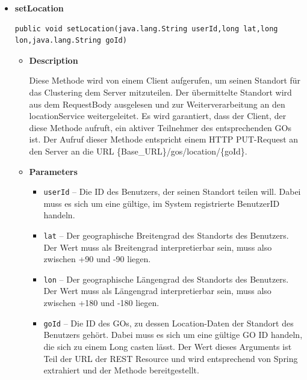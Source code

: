 \documentclass[11pt,a4paper]{report}
\begin{document}
{{{{{{{{{{{{{{{{{{{{\begin{itemize}
{\begin{itemize}
{}%
\end{itemize}
}%
\item{ 
\hypertarget{edu.kit.pse17.go_app.ClientCommunication.Upstream.GoRestController.setLocation(java.lang.String, long, long, java.lang.String)}{{\bf  setLocation}\\}
\begin{lstlisting}[frame=none]
public void setLocation(java.lang.String userId,long lat,long lon,java.lang.String goId)\end{lstlisting} %
\begin{itemize}
\item{
{\bf  Description}

Diese Methode wird von einem Client aufgerufen, um seinen Standort für das Clustering dem Server mitzuteilen. Der übermittelte Standort wird aus dem RequestBody ausgelesen und zur Weiterverarbeitung an den locationService weitergeleitet. Es wird garantiert, dass der Client, der diese Methode aufruft, ein aktiver Teilnehmer des entsprechenden GOs ist. Der Aufruf dieser Methode entspricht einem HTTP PUT-Request an den Server an die URL \{Base\_URL\}/gos/location/\{goId\}.
}
\item{
{\bf  Parameters}
  \begin{itemize}
   \item{
\texttt{userId} -- Die ID des Benutzers, der seinen Standort teilen will. Dabei muss es sich um eine gültige, im System registrierte BenutzerID handeln.}
   \item{
\texttt{lat} -- Der geographische Breitengrad des Standorts des Benutzers. Der Wert muss als Breitengrad interpretierbar sein, muss also zwischen +90 und -90 liegen.}
   \item{
\texttt{lon} -- Der geographische Längengrad des Standorts des Benutzers. Der Wert muss als Längengrad interpretierbar sein, muss also zwischen +180 und -180 liegen.}
   \item{
\texttt{goId} -- Die ID des GOs, zu dessen Location-Daten der Standort des Benutzers gehört. Dabei muss es sich um eine gültige GO ID handeln, die sich zu einem Long casten lässt. Der Wert dieses Arguments ist Teil der URL der REST Resource und wird entsprechend von Spring extrahiert und der Methode bereitgestellt.}
  \end{itemize}
}%
\end{itemize}
}%
\end{itemize}
}
}
}}}}}}}}}}}}}}}}}}
\end{document}
